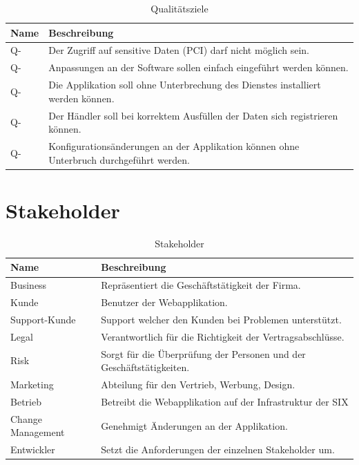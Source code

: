 \begin{table}[H]
	\centering
	\caption{Qualitätsziele}
	\begin{tabular}{ | p{3cm} | p{12cm} | }
		\toprule
		{\textbf{Name}} & {\textbf{Beschreibung}} \\
		\midrule
		Q-\arabic{quatar} \stepcounter{quatar} & Der Zugriff auf sensitive Daten (PCI) darf nicht möglich sein.\\ \hline
		Q-\arabic{quatar} \stepcounter{quatar} & Anpassungen an der Software sollen einfach eingeführt werden können. \\ \hline
		Q-\arabic{quatar} \stepcounter{quatar} & Die Applikation soll ohne Unterbrechung des Dienstes installiert werden können. \\ \hline
		Q-\arabic{quatar} \stepcounter{quatar} & Der Händler soll bei korrektem Ausfüllen der Daten sich registrieren können.\\ \hline
		Q-\arabic{quatar} \stepcounter{quatar} & Konfigurationsänderungen an der Applikation können ohne Unterbruch durchgeführt werden. \\
		\bottomrule
	\end{tabular}
\end{table}

\section{Stakeholder}

\begin{table}[H]
	\centering
	\caption{Stakeholder}
	\begin{tabular}{ | p{3cm} | p{12cm} | }
		\toprule
		{\textbf{Name}} & {\textbf{Beschreibung}} \\
		\midrule
		Business & Repräsentiert die Geschäftstätigkeit der Firma.\\ \hline
		Kunde & Benutzer der Webapplikation. \\ \hline
		Support-Kunde & Support welcher den Kunden bei Problemen unterstützt. \\ \hline
		Legal &  Verantwortlich für die Richtigkeit der Vertragsabschlüsse. \\ \hline
		Risk & Sorgt für die Überprüfung der Personen und der Geschäftstätigkeiten. \\ \hline
		Marketing & Abteilung für den Vertrieb, Werbung, Design. \\ \hline
		Betrieb & Betreibt die Webapplikation auf der Infrastruktur der SIX \\ \hline
		Change Management & Genehmigt Änderungen an der Applikation. \\ \hline
		Entwickler & Setzt die Anforderungen der einzelnen Stakeholder um. \\
		\bottomrule
	\end{tabular}
\end{table}
